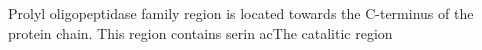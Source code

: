 Prolyl oligopeptidase family region is located towards the C-terminus of the protein chain. This region contains serin acThe catalitic region 